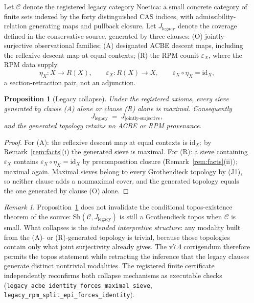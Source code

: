 \documentclass[11pt]{amsart}
\newtheorem{proposition}[theorem]{Proposition}
\theoremstyle{definition}
\theoremstyle{remark}
\newtheorem{remark}[theorem]{Remark}
\newcommand{\id}{\mathrm{id}}
\newcommand{\Sh}{\mathrm{Sh}}
\newcommand{\Noe}{\mathrm{Noetica}}
\newcommand{\Jleg}{J_{\mathrm{legacy}}}
\newcommand{\cC}{\mathcal{C}}
\begin{document}
Let $\cC$ denote the registered legacy category $\Noe$: a small concrete category of finite sets indexed by the forty distinguished CAS indices, with admissibility-relation generating maps and pullback closure. Let $\Jleg$ denote the coverage defined in the conservative source, generated by three clauses: (O) jointly-surjective observational families; (A) designated ACBE descent maps, including the reflexive descent map at equal contexts; (R) the RPM counit $\varepsilon_X$, where the RPM data supply
\[
\eta_X : X \to R(X), \qquad \varepsilon_X : R(X)\to X, \qquad \varepsilon_X\circ\eta_X=\id_X ,
\]
a section-retraction pair, not an adjunction.

\begin{proposition}[Legacy collapse]\label{prop:collapse}
Under the registered axioms, every sieve generated by clause \textup{(A)} alone or clause \textup{(R)} alone is maximal. Consequently
\[
\Jleg \;=\; J_{\text{jointly-surjective}},
\]
and the generated topology retains no ACBE or RPM provenance.
\end{proposition}

\begin{proof}
For (A): the reflexive descent map at equal contexts is $\id_X$; by Remark~\ref{rem:facts}(i) the generated sieve is maximal. For (R): a sieve containing $\varepsilon_X$ contains $\varepsilon_X\circ\eta_X=\id_X$ by precomposition closure (Remark~\ref{rem:facts}(ii)); maximal again. Maximal sieves belong to every Grothendieck topology by (J1), so neither clause adds a nonmaximal cover, and the generated topology equals the one generated by clause (O) alone.
\end{proof}

\begin{remark}
Proposition~\ref{prop:collapse} does not invalidate the conditional topos-existence theorem of the source: $\Sh(\cC,\Jleg)$ is still a Grothendieck topos when $\cC$ is small. What collapses is the \emph{intended interpretive structure}: any modality built from the (A)- or (R)-generated topology is trivial, because those topologies contain only what joint surjectivity already gives. The v7.4 corrigendum therefore permits the topos statement while retracting the inference that the legacy clauses generate distinct nontrivial modalities. The registered finite certificate independently reconfirms both collapse mechanisms as executable checks (\texttt{legacy\_acbe\_identity\_forces\_maximal\_sieve}, \texttt{legacy\_rpm\_split\_epi\_forces\_identity}).
\end{remark}
\end{document}
